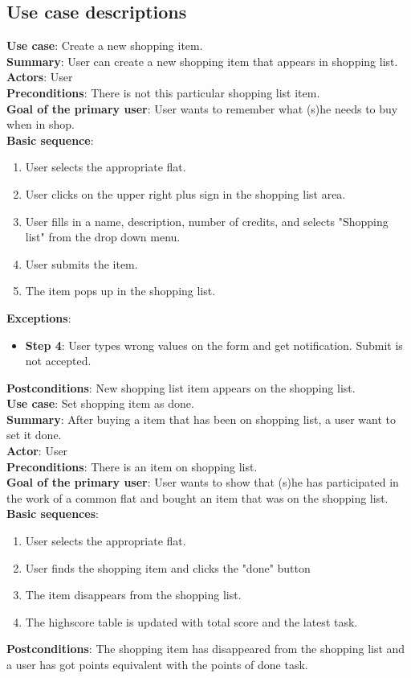 \documentclass{sig-alt-release2}
\begin{document}
\subsection{Use case descriptions}
\noindent
\textbf{Use case}: Create a new shopping item.\\
\textbf{Summary}: User can create a new shopping item that appears in shopping list.\\
\textbf{Actors}: User \\
\textbf{Preconditions}: There is not this particular shopping list item. \\
\textbf{Goal of the primary user}: User wants to remember what (s)he needs to buy when in shop. \\
\textbf{Basic sequence}:
\begin{enumerate}
\item User selects the appropriate flat.
\item User clicks on the upper right plus sign in the shopping list area. 
\item User fills in a name, description, number of credits, and selects "Shopping list" from the drop down menu. 
\item User submits the item.
\item The item pops up in the shopping list.
\end{enumerate}
\textbf{Exceptions}:
\begin{itemize}
\item \textbf{Step 4}: User types wrong values on the form and get notification. Submit is not accepted.
\end{itemize}
\textbf{Postconditions}: New shopping list item appears on the shopping list. \\

\noindent
\textbf{Use case}: Set shopping item as done. \\
\textbf{Summary}: After buying a item that has been on shopping list, a user want to set it done. \\
\textbf{Actor}: User \\
\textbf{Preconditions}: There is an item on shopping list. \\
\textbf{Goal of the primary user}: User wants to show that (s)he has participated in the work of a common flat and bought an item that was on the shopping list. \\
\textbf{Basic sequences}:
\begin{enumerate}
\item User selects the appropriate flat.
\item User finds the shopping item and clicks the "done" button
\item The item disappears from the shopping list.
\item The highscore table is updated with total score and the latest task.
\end{enumerate}
\textbf{Postconditions}: The shopping item has disappeared from the shopping list and a user has got points equivalent with the points of done task. \\
\end{document}
